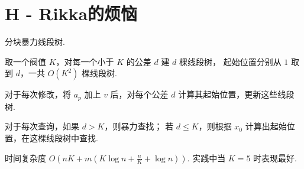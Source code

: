 \documentclass{ctexart}
\begin{document}
\section*{H - Rikka的烦恼}

分块暴力线段树.

取一个阀值 $K$，对每一个小于 $K$ 的公差 $d$ 建 $d$ 棵线段树，
起始位置分别从 $1$ 取到 $d$，一共 $O(K^2)$ 棵线段树.

对于每次修改，将 $a_p$ 加上 $v$ 后，对每个公差 $d$ 计算其起始位置，更新这些线段树.

对于每次查询，如果 $d > K$，则暴力查找；
若 $d \le K$，则根据 $x_0$ 计算出起始位置，在这棵线段树中查找.

时间复杂度 $O(nK+m(K\log{n}+\frac{n}{K}+\log{n}))$.
实践中当 $K=5$ 时表现最好.
\end{document}
